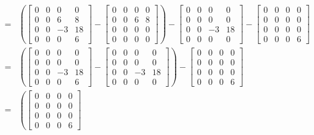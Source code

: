 \begin{tcolorbox}
\begin{align*}
    =& \left( \left[\begin{array}{rrrr} 0 & 0 & 0 & 0\\ 0 & 0 & 6 & 8 \\ 0 & 0 & -3 & 18 \\ 0 & 0 & 0 & 6 \end{array}\right]  
    - \left[\begin{array}{rrrr} 0 & 0 & 0 & 0\\ 0 & 0 & 6 & 8 \\ 0 & 0 & 0 & 0 \\ 0 &0 & 0 &0 \end{array}\right] \right) - \left[\begin{array}{rrrr} 0 & 0 & 0 & 0\\ 0 & 0 & 0 & 0 \\ 0 & 0 & -3 & 18 \\ 0 & 0 & 0 & 0 \end{array}\right] - \left[\begin{array}{rrrr} 0 & 0 & 0 & 0\\ 0 & 0 & 0 & 0 \\ 0 & 0 & 0 & 0 \\ 0 & 0 & 0 & 6 \end{array}\right]  \\ 
    =& \left( \left[\begin{array}{rrrr} 0 & 0 & 0 & 0\\ 0 & 0 & 0 & 0 \\ 0 & 0 & -3 & 18 \\ 0 & 0 & 0 & 6 \end{array}\right]  
    - \left[\begin{array}{rrrr} 0 & 0 & 0 & 0\\ 0 & 0 & 0 & 0 \\ 0 & 0 & -3 & 18 \\ 0 & 0 & 0 & 0 \end{array}\right] \right)  - \left[\begin{array}{rrrr} 0 & 0 & 0 & 0\\ 0 & 0 & 0 & 0 \\ 0 & 0 & 0 & 0 \\ 0 & 0 & 0 & 6 \end{array}\right]  \\ 
    =& \left( \left[\begin{array}{rrrr} 0 & 0 & 0 & 0\\ 0 & 0 & 0 & 0 \\ 0 & 0 & 0 & 0 \\ 0 & 0 & 0 & 6 \end{array}\right]  

\end{align*}
\end{tcolorbox}
